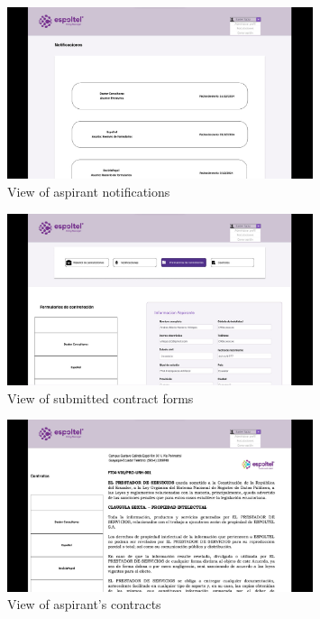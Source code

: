 \documentclass{scrreprt}
\begin{document}
\begin{figure}[H]
	\centering \small
	\includegraphics[width=0.8\textwidth]{WebPrototype/wflow-53.jpeg}
	\caption{View of aspirant notifications}
\end{figure}

\begin{figure}[H]
	\centering \small
	\includegraphics[width=0.8\textwidth]{WebPrototype/wflow-54.jpeg}
	\caption{View of submitted contract forms}
\end{figure}

\begin{figure}[H]
	\centering \small
	\includegraphics[width=0.8\textwidth]{WebPrototype/wflow-55.jpeg}
	\caption{View of aspirant's contracts}
\end{figure}
\end{document}
